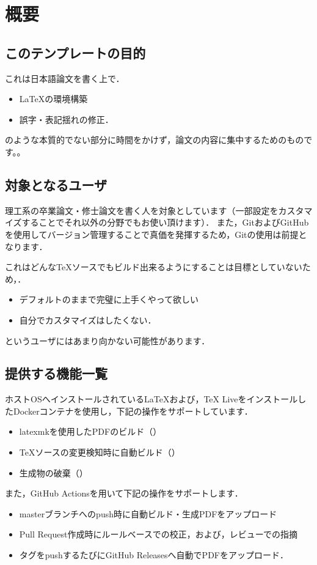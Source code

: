 \documentclass[main]{subfiles}
\begin{document}
\section{概要}

\subsection{このテンプレートの目的}

これは日本語論文を書く上で．

\begin{itemize}
    \item LaTeXの環境構築
    \item 誤字・表記揺れの修正．
\end{itemize}

のような本質的でない部分に時間をかけず，論文の内容に集中するためのものです。。

\subsection{対象となるユーザ}
理工系の卒業論文・修士論文を書く人を対象としています（一部設定をカスタマイズすることでそれ以外の分野でもお使い頂けます）．
また，GitおよびGitHubを使用してバージョン管理することで真価を発揮するため，Gitの使用は前提となります．


これはどんなTeXソースでもビルド出来るようにすることは目標としていないため，．

\begin{itemize}
    \item デフォルトのままで完璧に上手くやって欲しい
    \item 自分でカスタマイズはしたくない．
\end{itemize}

というユーザにはあまり向かない可能性があります．

\subsection{提供する機能一覧}

ホストOSへインストールされているLaTeXおよび，TeX LiveをインストールしたDockerコンテナを使用し，下記の操作をサポートしています．

\begin{itemize}
    \item latexmkを使用したPDFのビルド（）
    \item TeXソースの変更検知時に自動ビルド（）
    \item 生成物の破棄（）
\end{itemize}

また，GitHub Actionsを用いて下記の操作をサポートします．

\begin{itemize}
    \item masterブランチへのpush時に自動ビルド・生成PDFをアップロード
    \item Pull Request作成時にルールベースでの校正，および，レビューでの指摘
    \item タグをpushするたびにGitHub Releasesへ自動でPDFをアップロード．
\end{itemize}
\end{document}
